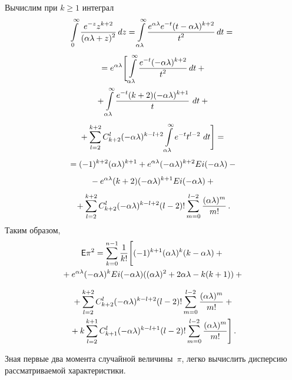 \begin{multicols}{2}
\begin{multline*}
\end{multline*}
%
Вычислим при $k\ge1$ интеграл
\begin{multline*}
\int\limits_{0}^{\infty}\displaystyle\frac{\displaystyle e^{-z}z^{k+2}\mathstrut}{\displaystyle (\alpha\lambda+z)^2\mathstrut}\,dz=
\int\limits_{\alpha\lambda}^{\infty}\displaystyle\frac{\displaystyle e^{\alpha\lambda}e^{-t}(t-\alpha\lambda)^{k+2}\mathstrut}{\displaystyle t^2\mathstrut}\,dt={} \\[4pt]
{}=e^{\alpha\lambda}\Bigg[\int\limits_{\alpha\lambda}^{\infty}\displaystyle\frac{\displaystyle e^{-t}(-\alpha\lambda)^{k+2}\mathstrut}{\displaystyle t^2\mathstrut}\,dt+{}\\
{}+\int\limits_{\alpha\lambda}^{\infty}\displaystyle\frac{\displaystyle e^{-t}(k+2)(-\alpha\lambda)^{k+1}\mathstrut}{\displaystyle t\mathstrut}\ dt+{} \\[4pt]
{}+\sum_{l=2}^{k+2}C_{k+2}^l(-\alpha\lambda)^{k-l+2}\int\limits_{\alpha\lambda}^{\infty}e^{-t}t^{l-2}\ dt\Bigg]={} \\[4pt]
{}=(-1)^{k+2}(\alpha\lambda)^{k+1}+e^{\alpha\lambda}(-\alpha\lambda)^{k+2}
Ei(-\alpha\lambda)-{}\\[4pt]
{}- e^{\alpha\lambda}(k+2)(-\alpha\lambda)^{k+1}Ei(-\alpha\lambda)+{}\\[4pt]
{}+\sum_{l=2}^{k+2}C_{k+2}^l(-\alpha\lambda)^{k-l+2}
(l-2)!\sum_{m=0}^{l-2}\displaystyle\frac{\displaystyle (\alpha\lambda)^m\mathstrut}{\displaystyle m!\mathstrut}\,.
\end{multline*}
%
Таким образом,
\begin{multline*}
\e\pi^2=
\sum_{k=0}^{n-1}\fr{1}{k!}\Bigg[(-1)^{k+1}(\alpha\lambda)^{k}(k-\alpha\lambda)+{}\\
{}+e^{\alpha\lambda}(-\alpha\lambda)^{k}Ei(-\alpha\lambda)((\alpha\lambda)^{2}+2\alpha\lambda-k(k+1))+{} %
\end{multline*}

\noindent
\begin{multline*}
{}+\sum_{l=2}^{k+2}C_{k+2}^l(-\alpha\lambda)^{k-l+2}(l-2)!\sum_{m=0}^{l-2}\displaystyle\frac{\displaystyle (\alpha\lambda)^m\mathstrut}{\displaystyle m!\mathstrut}+{}\\
{}+k\sum_{l=2}^{k+1}C_{k+1}^l(-\alpha\lambda)^{k-l+1}(l-2)!\sum_{m=0}^{l-2}\displaystyle\frac{\displaystyle (\alpha\lambda)^m\mathstrut}{\displaystyle m!\mathstrut}\Bigg]\,.
\end{multline*}

Зная первые два момента случайной величины~$\pi$, легко вычислить дисперсию рассматриваемой характеристики.


\end{multicols}
